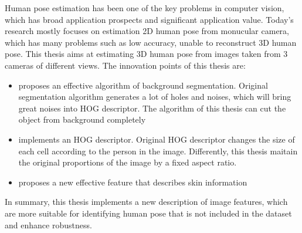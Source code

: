 
\begin{eabstract}
Human pose estimation has been one of the key problems in computer vision, which has broad application prospects and significant application value. Today's research mostly focuses on estimation 2D human pose from monucular camera, which has many problems such as low accuracy, unable to reconstruct 3D human pose. This thesis aims at estimating 3D human pose from images taken from 3 cameras of different views.
The innovation points of this thesis are:
  \begin{itemize}
    \item proposes an effective algorithm of background segmentation. Original segmentation algorithm generates a lot of holes and noises, which will bring great noises into HOG descriptor. The algorithm of this thesis can cut the object from background completely
    \item implements an HOG descriptor. Original HOG descriptor changes the size of each cell according to the person in the image. Differently, this thesis maitain the original proportions of the image by a fixed aspect ratio.
    \item proposes a new effective feature that describes skin information
  \end{itemize}

  In summary, this thesis implements a new description of image features, which are more suitable for identifying human pose that is not included in the dataset and enhance robustness.
\end{eabstract}

